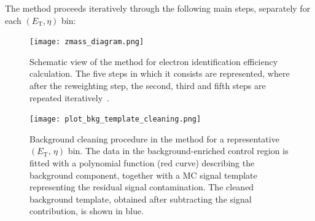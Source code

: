 The method proceeds iteratively through the following main steps, separately for each $(E_{\mathrm{T}},\eta)$ bin:

\begin{figure}[htbp]
  \centering
  \texttt{[image: zmass\_diagram.png]}
  \caption{Schematic view of the \zmass method for electron identification efficiency calculation. The five steps in which it consists are represented, where after the reweighting step, the second, third and fifth steps are repeated iteratively~\cite{elias_thesis}.}
  \label{fig:zmass_algo}
\end{figure}

\begin{figure}[h]
  \centering
  \texttt{[image: plot\_bkg\_template\_cleaning.png]}
  \caption{Background cleaning procedure in the \zmass method for a representative $(E_{\mathrm{T}},\,\eta)$ bin. The data in the background-enriched control region is fitted with a polynomial function (red curve) describing the background component, together with a MC signal template representing the residual signal contamination. The cleaned background template, obtained after subtracting the signal contribution, is shown in blue.}
  \label{fig:bkg_clean}
\end{figure}


